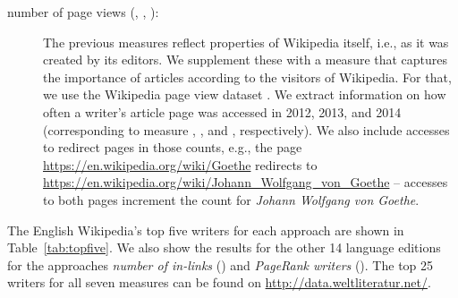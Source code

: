\documentclass[a4paper,12pt]{scrartcl}
\begin{document}
\begin{description}
\item[number of page views (\rpvtwo, \rpvthree, \rpvfour):] The
  previous measures reflect properties of Wikipedia itself, i.e., as
  it was created by its editors. We supplement these with a measure
  that captures the importance of articles according to the visitors
  of Wikipedia. For that, we use the Wikipedia page view dataset
  \cite{pagecounts}. %
  We extract information on how often a writer's article page was
  accessed in 2012, 2013, and 2014 (corresponding to measure \rpvtwo,
  \rpvthree, and \rpvfour, respectively). We also include accesses to
  redirect pages in those counts, e.g., the page
  \url{https://en.wikipedia.org/wiki/Goethe} redirects to
  \url{https://en.wikipedia.org/wiki/Johann_Wolfgang_von_Goethe} --
  accesses to both pages increment the count for \emph{Johann Wolfgang
    von Goethe}.
\end{description}




The English Wikipedia's top five writers for each approach are shown
in Table~\ref{tab:topfive}. We also show the results for the other 14
language editions for the approaches \emph{number of in-links}
(\rinlinks) and \emph{PageRank writers} (\rprwriter).
%
The top 25 writers for all seven measures can be found on
\url{http://data.weltliteratur.net/}.
%

%
%
%
\newcommand{\n}[1]{\sffamily \textbf{#1}}

\end{document}
